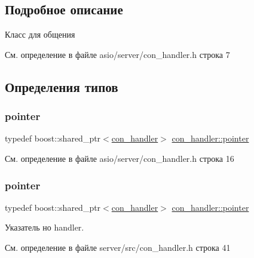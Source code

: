 \subsection{Подробное описание}
Класс для общения 

См. определение в файле asio/server/con\+\_\+handler.\+h строка 7



\subsection{Определения типов}
\mbox{\label{classcon__handler_ada4a1b970f9fd8e55460a58cf7f7ce2c}} 
\subsubsection{\texorpdfstring{pointer}{pointer}\hspace{0.1cm}{\footnotesize\ttfamily [1/2]}}
{\footnotesize\ttfamily typedef boost\+::shared\+\_\+ptr$<$\mbox{\hyperlink{classcon__handler}{con\+\_\+handler}}$>$ \mbox{\hyperlink{classcon__handler_ada4a1b970f9fd8e55460a58cf7f7ce2c}{con\+\_\+handler\+::pointer}}}



См. определение в файле asio/server/con\+\_\+handler.\+h строка 16

\mbox{\label{classcon__handler_ada4a1b970f9fd8e55460a58cf7f7ce2c}} 
\subsubsection{\texorpdfstring{pointer}{pointer}\hspace{0.1cm}{\footnotesize\ttfamily [2/2]}}
{\footnotesize\ttfamily typedef boost\+::shared\+\_\+ptr$<$\mbox{\hyperlink{classcon__handler}{con\+\_\+handler}}$>$ \mbox{\hyperlink{classcon__handler_ada4a1b970f9fd8e55460a58cf7f7ce2c}{con\+\_\+handler\+::pointer}}}



Указатель но handler. 



См. определение в файле server/src/con\+\_\+handler.\+h строка 41



